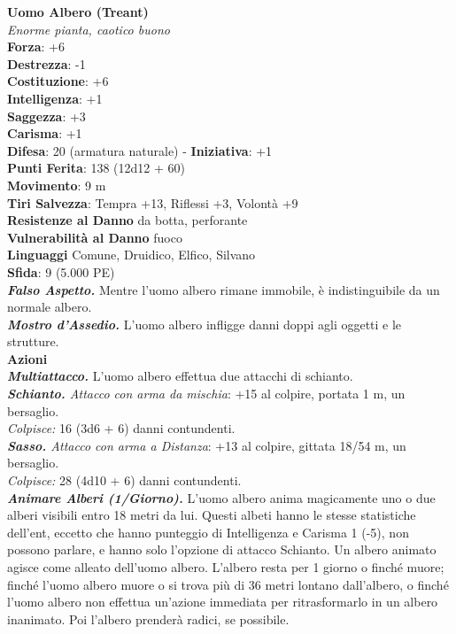 \begin{multicols}{2}
\medskip\textbf{Uomo Albero (Treant)}\\
\emph{Enorme pianta, caotico buono}\\
\textbf{Forza}: +6\\
\textbf{Destrezza}: -1\\
\textbf{Costituzione}: +6\\
\textbf{Intelligenza}: +1\\
\textbf{Saggezza}: +3\\
\textbf{Carisma}: +1\\
\textbf{Difesa}: 20 (armatura naturale) - \textbf{Iniziativa}: +1\\
\textbf{Punti Ferita}: 138 (12d12 + 60)\\
\textbf{Movimento}: 9 m\\
\textbf{Tiri Salvezza}: Tempra +13, Riflessi +3, Volontà +9\\
\textbf{Resistenze al Danno} da botta, perforante\\
\textbf{Vulnerabilità al Danno} fuoco\\
\textbf{Linguaggi} Comune, Druidico, Elfico, Silvano\\
\textbf{Sfida}: 9 (5.000 PE)\smallskip\\
\emph{\textbf{Falso Aspetto.}} Mentre l'uomo albero rimane immobile, è indistinguibile da un normale albero.\\
\emph{\textbf{Mostro d'Assedio.}} L'uomo albero infligge danni doppi agli oggetti e le strutture.\\
\smallskip\textbf{Azioni}\\
\emph{\textbf{Multiattacco.}} L'uomo albero effettua due attacchi di schianto.\\
\emph{\textbf{Schianto.} Attacco con arma da mischia}: +15 al colpire, portata 1 m, un bersaglio.\\
\emph{Colpisce:} 16 (3d6 + 6) danni contundenti.\\
\emph{\textbf{Sasso.} Attacco con arma a Distanza}: +13 al colpire, gittata 18/54 m, un bersaglio.\\
\emph{Colpisce:} 28 (4d10 + 6) danni contundenti.\\
\emph{\textbf{Animare Alberi (1/Giorno).}} L'uomo albero anima magicamente uno o due alberi visibili entro 18 metri da lui. Questi albeti hanno le stesse statistiche dell'ent, eccetto che hanno punteggio di Intelligenza e Carisma 1 (-5), non possono parlare, e hanno solo l'opzione di attacco Schianto. Un albero animato agisce come alleato dell'uomo albero. L'albero resta per 1 giorno o finché muore; finché l'uomo albero muore o si trova più di 36 metri lontano dall'albero, o finché l'uomo albero non effettua un'azione immediata per ritrasformarlo in un albero inanimato. Poi l'albero prenderà radici, se possibile. \\

\end{multicols}
